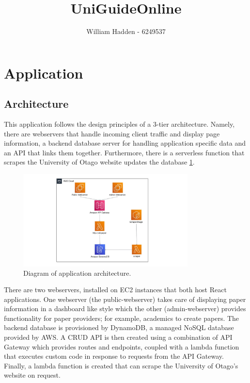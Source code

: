 \documentclass[12pt]{article}
\begin{document}
\title{UniGuideOnline \\ }

\author{William Hadden - 6249537} 

\maketitle

\section{Application}
\subsection{Architecture}

This application follows the design principles of a 3-tier architecture. Namely, there are webservers that handle incoming client traffic and display page information, a backend database server for handling application specific data and an API that links them together. Furthermore, there is a serverless function that scrapes the University of Otago website updates the database \ref{fig: application_architecutre}.

\begin{figure}[h!]
    \caption{Diagram of application architecture.}
    \label{fig: application_architecutre}
    \begin{center}
        \includegraphics[width=0.8\textwidth]{../docs-assets/AWS_architecture.jpg}
    \end{center} 
\end{figure}


There are two webservers, installed on EC2 instances that both host React applications. One webserver (the public-webserver) takes care of displaying paper information in a dashboard like style which the other (admin-webserver) provides functionality for paper providers; for example, academics to create papers. The backend database is provisioned by DynamoDB, a managed NoSQL database provided by AWS. A CRUD API is then created using a combination of API Gateway which provides routes and endpoints, coupled with a lambda function that executes custom code in response to requests from the API Gateway. Finally, a lambda function is created that can scrape the University of Otago's website on request.
\end{document}
